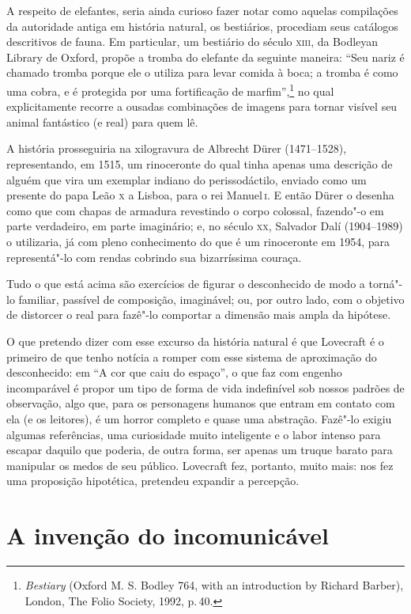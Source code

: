 A respeito de elefantes, seria ainda curioso fazer notar como aquelas
compilações da autoridade antiga em história natural, os bestiários,
procediam seus catálogos descritivos de fauna. Em particular, um
bestiário do século \textsc{xiii}, da Bodleyan Library de Oxford, propõe a tromba
do elefante da seguinte maneira: ``Seu nariz é chamado tromba porque ele
o utiliza para levar comida à boca; a tromba é como uma cobra, e é
protegida por uma fortificação de marfim'',\footnote{\emph{Bestiary}
  (Oxford M. S. Bodley 764, with an introduction by Richard Barber),
  London, The Folio Society, 1992, p.\,40.} no qual explicitamente
recorre a ousadas combinações de imagens para tornar visível seu animal
fantástico (e real) para quem lê.

A história prosseguiria na xilogravura de Albrecht Dürer (1471--1528),
representando, em 1515, um rinoceronte do qual tinha apenas uma
descrição de alguém que vira um exemplar indiano do perissodáctilo,
enviado como um presente do papa Leão \textsc{x} a Lisboa, para o rei Manuel\,\textsc{i}. E
então Dürer o desenha como que com chapas de armadura revestindo o corpo
colossal, fazendo"-o em parte verdadeiro, em parte imaginário; e, no
século \textsc{xx}, Salvador Dalí (1904--1989) o utilizaria, já com pleno
conhecimento do que é um rinoceronte em 1954, para representá"-lo com
rendas cobrindo sua bizarríssima couraça.

Tudo o que está acima são exercícios de figurar o desconhecido de modo a
torná"-lo familiar, passível de composição, imaginável; ou, por outro
lado, com o objetivo de distorcer o real para fazê"-lo comportar a
dimensão mais ampla da hipótese.

O que pretendo dizer com esse excurso da história natural é que
Lovecraft é o primeiro de que tenho notícia a romper com esse sistema de
aproximação do desconhecido: em ``A cor que caiu do espaço'', o que faz
com engenho incomparável é propor um tipo de forma de vida indefinível
sob nossos padrões de observação, algo que, para os personagens humanos
que entram em contato com ela (e os leitores), é um horror completo e
quase uma abstração. Fazê"-lo exigiu algumas referências, uma curiosidade
muito inteligente e o labor intenso para escapar daquilo que poderia, de
outra forma, ser apenas um truque barato para manipular os medos de seu
público. Lovecraft fez, portanto, muito mais: nos fez uma proposição
hipotética, pretendeu expandir a percepção.

\section*{A invenção do incomunicável}

